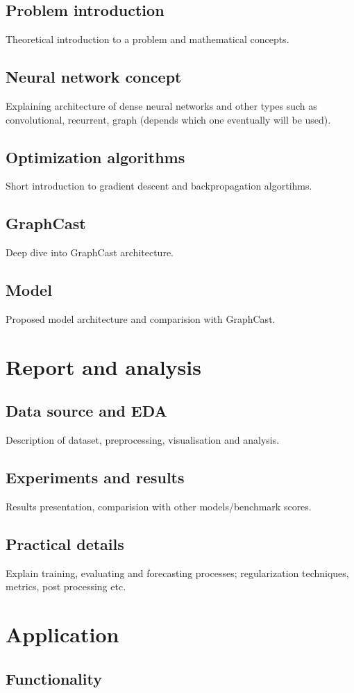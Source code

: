 \documentclass{article}
\begin{document}
	\subsection{Problem introduction}
	Theoretical introduction to a problem and mathematical concepts. 
	\subsection{Neural network concept}
	Explaining architecture of dense neural networks and other types such as convolutional, recurrent, graph (depends which one eventually will be used). 
	\subsection{Optimization algorithms}
	Short introduction to gradient descent and backpropagation algortihms. 
	\subsection{GraphCast}
	Deep dive into GraphCast architecture.
	\subsection{Model}
	Proposed model architecture and comparision with GraphCast. 
	\section{Report and analysis}
	\subsection{Data source and EDA}
	Description of dataset, preprocessing, visualisation and analysis.
	\subsection{Experiments and results}
	Results presentation, comparision with other models/benchmark scores. 
	\subsection{Practical details}
	Explain training, evaluating and forecasting processes;
	regularization techniques, metrics, post processing etc.
	\section{Application}
	\subsection{Functionality}
\end{document}
